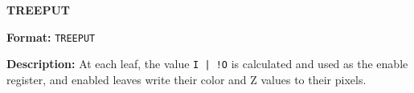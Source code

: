 \newpage
\noindent\textsf{\textbf{\Large TREEPUT}}\par
{}\par\begin{indented}{\bf Format:}
{\tt TREEPUT }\par\vspace{3ex}
\end{indented}\vspace{4ex}
\begin{indented}{\bf Description:}
At each leaf, the value {\tt I | !O} is calculated and used as the
enable register, and enabled leaves write their color and Z values to
their pixels.
\end{indented}
\vspace{2em}

